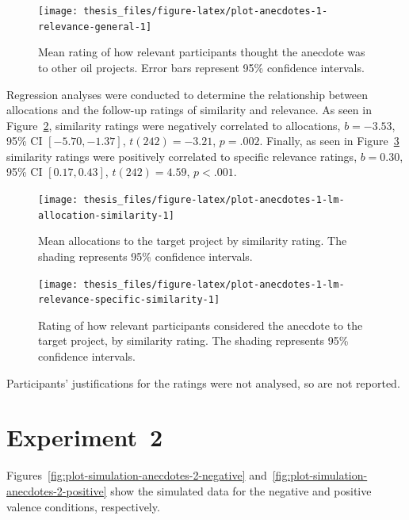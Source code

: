 \documentclass[a4paper, nobind, dvipsnames]{templates/ociamthesis}
\theoremstyle{definition}
\theoremstyle{definition}
\theoremstyle{definition}
\theoremstyle{definition}
\theoremstyle{remark}
\begin{document}
\begin{figure}
\texttt{[image: thesis\_files/figure-latex/plot-anecdotes-1-relevance-general-1]} \caption{Mean rating of how relevant participants thought the anecdote was to other oil projects. Error bars represent 95\% confidence intervals.}\label{fig:plot-anecdotes-1-relevance-general}
\end{figure}

Regression analyses were conducted to determine the relationship between
allocations and the follow-up ratings of similarity and relevance. As seen in
Figure~\ref{fig:plot-anecdotes-1-lm-allocation-similarity}, similarity ratings
were negatively correlated to allocations,
\(b = -3.53\), 95\% CI \([-5.70, -1.37]\), \(t(242) = -3.21\), \(p = .002\). Finally, as seen in
Figure~\ref{fig:plot-anecdotes-1-lm-relevance-specific-similarity} similarity
ratings were positively correlated to specific relevance ratings,
\(b = 0.30\), 95\% CI \([0.17, 0.43]\), \(t(242) = 4.59\), \(p < .001\).




\begin{figure}
\texttt{[image: thesis\_files/figure-latex/plot-anecdotes-1-lm-allocation-similarity-1]} \caption{Mean allocations to the target
project by similarity rating. The shading represents 95\% confidence intervals.}\label{fig:plot-anecdotes-1-lm-allocation-similarity}
\end{figure}



\begin{figure}
\texttt{[image: thesis\_files/figure-latex/plot-anecdotes-1-lm-relevance-specific-similarity-1]} \caption{Rating of how relevant participants considered the anecdote to the target project, by similarity rating. The shading represents 95\% confidence intervals.}\label{fig:plot-anecdotes-1-lm-relevance-specific-similarity}
\end{figure}

Participants' justifications for the ratings were not analysed, so are not reported.

\hypertarget{anecdotes-2-appendix}{%
\section{Experiment~2}\label{anecdotes-2-appendix}}

Figures~\ref{fig:plot-simulation-anecdotes-2-negative}
and~\ref{fig:plot-simulation-anecdotes-2-positive} show the simulated data for
the negative and positive valence conditions, respectively.
\end{document}
